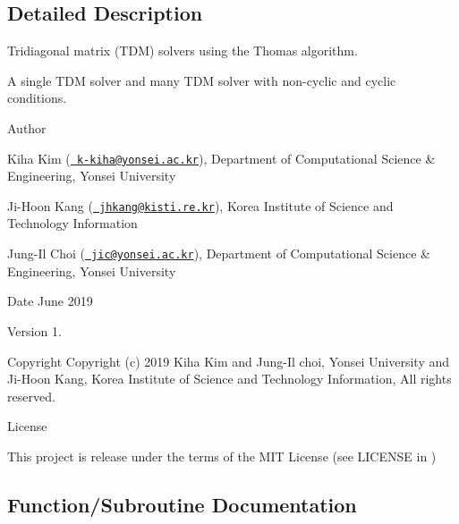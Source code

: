 \subsection{Detailed Description}
Tridiagonal matrix (T\+DM) solvers using the Thomas algorithm. 

A single T\+DM solver and many T\+DM solver with non-\/cyclic and cyclic conditions. \begin{DoxyAuthor}{Author}

\end{DoxyAuthor}

\begin{DoxyItemize}
\item Kiha Kim (\href{mailto:k-kiha@yonsei.ac.kr}{\texttt{ k-\/kiha@yonsei.\+ac.\+kr}}), Department of Computational Science \& Engineering, Yonsei University
\item Ji-\/\+Hoon Kang (\href{mailto:jhkang@kisti.re.kr}{\texttt{ jhkang@kisti.\+re.\+kr}}), Korea Institute of Science and Technology Information
\item Jung-\/\+Il Choi (\href{mailto:jic@yonsei.ac.kr}{\texttt{ jic@yonsei.\+ac.\+kr}}), Department of Computational Science \& Engineering, Yonsei University
\end{DoxyItemize}

\begin{DoxyDate}{Date}
June 2019 
\end{DoxyDate}
\begin{DoxyVersion}{Version}
1. 
\end{DoxyVersion}
\begin{DoxyParagraph}{Copyright}
Copyright (c) 2019 Kiha Kim and Jung-\/\+Il choi, Yonsei University and Ji-\/\+Hoon Kang, Korea Institute of Science and Technology Information, All rights reserved. 
\end{DoxyParagraph}
\begin{DoxyParagraph}{License }

\end{DoxyParagraph}
This project is release under the terms of the M\+IT License (see L\+I\+C\+E\+N\+SE in ) 

\subsection{Function/\+Subroutine Documentation}
\mbox{\label{tdmas_8f90_a6c50d548eaa4b5e9b96ccbf8f65cb12a}} 
